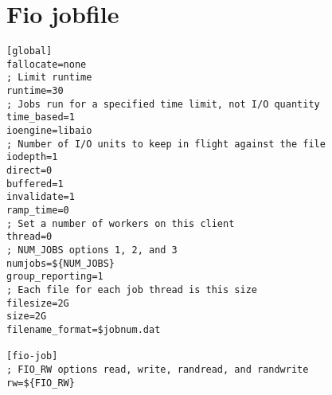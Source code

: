\chapter{Fio jobfile}
\label{appendix:fio_jobfile}

\begin{lstlisting}
[global]
fallocate=none
; Limit runtime
runtime=30
; Jobs run for a specified time limit, not I/O quantity
time_based=1
ioengine=libaio
; Number of I/O units to keep in flight against the file
iodepth=1
direct=0
buffered=1
invalidate=1
ramp_time=0
; Set a number of workers on this client
thread=0
; NUM_JOBS options 1, 2, and 3
numjobs=${NUM_JOBS}
group_reporting=1
; Each file for each job thread is this size
filesize=2G
size=2G
filename_format=$jobnum.dat

[fio-job]
; FIO_RW options read, write, randread, and randwrite
rw=${FIO_RW}
\end{lstlisting}

